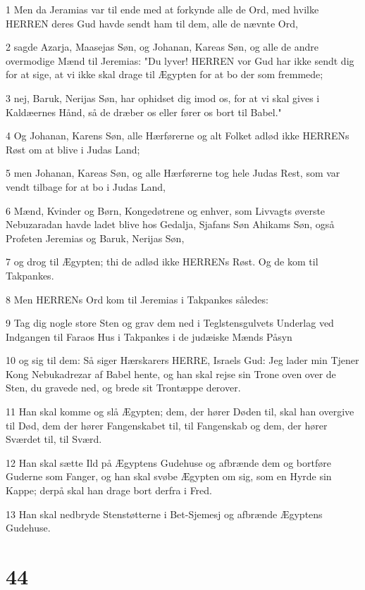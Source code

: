 \par 1 Men da Jeramias var til ende med at forkynde alle de Ord, med hvilke HERREN deres Gud havde sendt ham til dem, alle de nævnte Ord,
\par 2 sagde Azarja, Maasejas Søn, og Johanan, Kareas Søn, og alle de andre overmodige Mænd til Jeremias: "Du lyver! HERREN vor Gud har ikke sendt dig for at sige, at vi ikke skal drage til Ægypten for at bo der som fremmede;
\par 3 nej, Baruk, Nerijas Søn, har ophidset dig imod os, for at vi skal gives i Kaldæernes Hånd, så de dræber os eller fører os bort til Babel."
\par 4 Og Johanan, Karens Søn, alle Hærførerne og alt Folket adlød ikke HERRENs Røst om at blive i Judas Land;
\par 5 men Johanan, Kareas Søn, og alle Hærførerne tog hele Judas Rest, som var vendt tilbage for at bo i Judas Land,
\par 6 Mænd, Kvinder og Børn, Kongedøtrene og enhver, som Livvagts øverste Nebuzaradan havde ladet blive hos Gedalja, Sjafans Søn Ahikams Søn, også Profeten Jeremias og Baruk, Nerijas Søn,
\par 7 og drog til Ægypten; thi de adlød ikke HERRENs Røst. Og de kom til Takpankes.
\par 8 Men HERRENs Ord kom til Jeremias i Takpankes således:
\par 9 Tag dig nogle store Sten og grav dem ned i Teglstensgulvets Underlag ved Indgangen til Faraos Hus i Takpankes i de judæiske Mænds Påsyn
\par 10 og sig til dem: Så siger Hærskarers HERRE, Israels Gud: Jeg lader min Tjener Kong Nebukadrezar af Babel hente, og han skal rejse sin Trone oven over de Sten, du gravede ned, og brede sit Trontæppe derover.
\par 11 Han skal komme og slå Ægypten; dem, der hører Døden til, skal han overgive til Død, dem der hører Fangenskabet til, til Fangenskab og dem, der hører Sværdet til, til Sværd.
\par 12 Han skal sætte Ild på Ægyptens Gudehuse og afbrænde dem og bortføre Guderne som Fanger, og han skal svøbe Ægypten om sig, som en Hyrde sin Kappe; derpå skal han drage bort derfra i Fred.
\par 13 Han skal nedbryde Stenstøtterne i Bet-Sjemesj og afbrænde Ægyptens Gudehuse.

\chapter{44}

